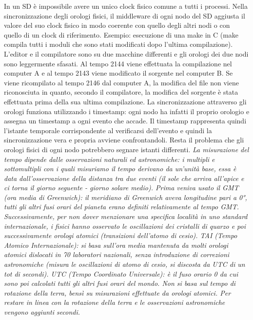 \documentclass[12pt,italian]{report}
\begin{document}
In un SD è impossibile avere un unico clock fisico comune a tutti i processi. Nella sincronizzazione degli orologi fisici, il middleware di ogni nodo del SD aggiusta il valore del suo clock fisico in modo coerente con quello degli altri nodi o con quello di un clock di riferimento. 
\bigbreak
Esempio: esecuzione di una make in C (make compila tutti i moduli che sono stati modificati dopo l'ultima compilazione). L'editor e il compilatore sono su due macchine differenti e gli orologi dei due nodi sono leggermente sfasati. Al tempo 2144 viene effettuata la compilazione nel computer A e al tempo 2143 viene modificato il sorgente nel computer B. Se viene ricompilato al tempo 2146 dal computer A, la modifica del file non viene riconosciuta in quanto, secondo il compilatore, la modifica del sorgente è stata effettuata prima della sua ultima compilazione. 
\bigbreak
La sincronizzazione attraverso gli orologi funziona utilizzando i timestamp: ogni nodo ha infatti il proprio orologio e assegna un timestamp a ogni evento che accade. Il timestamp rappresenta quindi l'istante temporale corrispondente al verificarsi dell'evento e quindi la sincronizzazione vera e propria avviene confrontandoli. Resta il problema che gli orologi fisici di ogni nodo potrebbero segnare istanti differenti.
\bigbreak
\textit{La misurazione del tempo dipende dalle osservazioni naturali ed astronomiche: i multipli e sottomultipli con i quali misuriamo il tempo derivano da un'unità base, essa è data dall'osservazione della distanza tra due eventi (il sole che arriva all'apice e ci torna il giorno seguente - giorno solare medio). Prima veniva usato il GMT (ora media di Greenwich): il meridiano di Greenwich aveva longitudine pari a 0°, tutti gli altri fusi orari del pianeta erano definiti relativamente al tempo GMT. Successivamente, per non dover menzionare una specifica località in uno standard internazionale, i fisici hanno osservato le oscillazioni dei cristalli di quarzo e poi successivamente orologi atomici (transizioni dell'atomo di cesio). 
\bigbreak
TAI (Tempo Atomico Internazionale): si basa sull'ora media mantenuta da molti orologi atomici dislocati in 70 laboratori nazionali, senza introduzione di correzioni astronomiche (misura le oscillazioni di atomo di cesio, si discosta da UTC di un tot di secondi). 
\bigbreak
UTC (Tempo Coordinato Universale): è il fuso orario 0 da cui sono poi calcolati tutti gli altri fusi orari del mondo. Non si basa sul tempo di rotazione della terra, bensì su misurazioni effettuate da orologi atomici. Per restare in linea con la rotazione della terra e le osservazioni astronomiche vengono aggiunti secondi.} 
\end{document}
